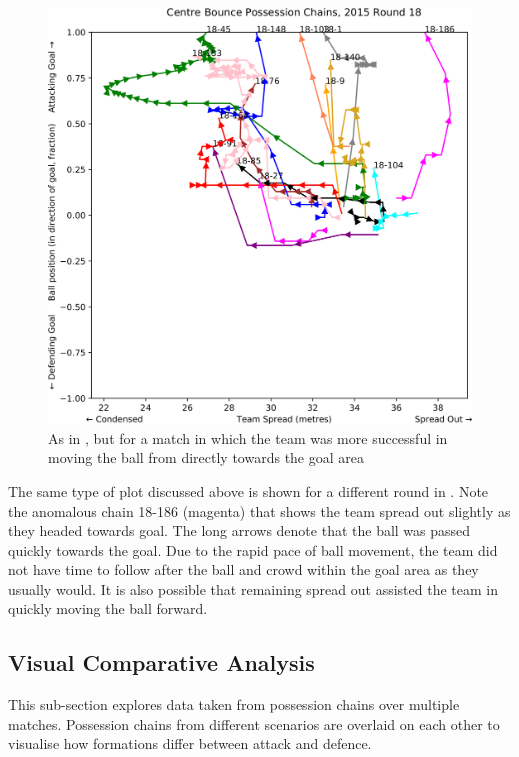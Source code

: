 \begin{figure}[!htb]
\centering
\includegraphics[width=0.9\linewidth]{figs/paper/2018-cb-r18.png}
\caption{As in , but for a match in which the team was more successful in moving the ball from \centrebounce{} directly towards the goal area}
\label{fig:2018-cb-r18}
\end{figure}

The same type of plot discussed above is shown for a different round in . Note the anomalous chain 18-186 (magenta) that shows the team spread out slightly as they headed towards goal. The long arrows denote that the ball was passed quickly towards the goal. Due to the rapid pace of ball movement, the team did not have time to follow after the ball and crowd within the goal area as they usually would. It is also possible that remaining spread out assisted the team in quickly moving the ball forward.

\subsection{Visual Comparative Analysis}

This sub-section explores data taken from possession chains over multiple matches. %
Possession chains from different scenarios are overlaid on each other to visualise how formations differ between attack and defence.

